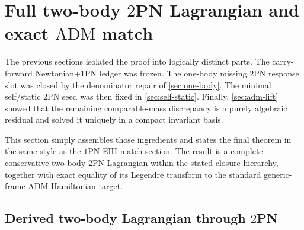 \documentclass[11pt]{article}
\newcommand{\OnePN}{\mathrm{1PN}}
\newcommand{\TwoPN}{\mathrm{2PN}}
\newcommand{\ADM}{\mathrm{ADM}}
\begin{document}
\section{Full two-body \texorpdfstring{$2$}{2}PN Lagrangian and exact \texorpdfstring{$\ADM$}{ADM} match}
\label{sec:full-assembly}

The previous sections isolated the proof into logically distinct parts.  The carry-forward
Newtonian+\(\OnePN\) ledger was frozen.  The one-body missing \(\TwoPN\) response slot was
closed by the denominator repair of \cref{sec:one-body}.  The minimal self/static
\(\TwoPN\) seed was then fixed in \cref{sec:self-static}.  Finally,
\cref{sec:adm-lift} showed that the remaining comparable-mass discrepancy is a purely
algebraic residual and solved it uniquely in a compact invariant basis.

This section simply assembles those ingredients and states the final theorem in the same
style as the \(\OnePN\) EIH-match section.  The result is a complete conservative two-body
\(\TwoPN\) Lagrangian within the stated closure hierarchy, together with exact equality of
its Legendre transform to the standard generic-frame \(\ADM\) Hamiltonian target.

\subsection{Derived two-body Lagrangian through \texorpdfstring{$2$}{2}PN}
\label{sec:full-assembly-lagrangian}
\end{document}

